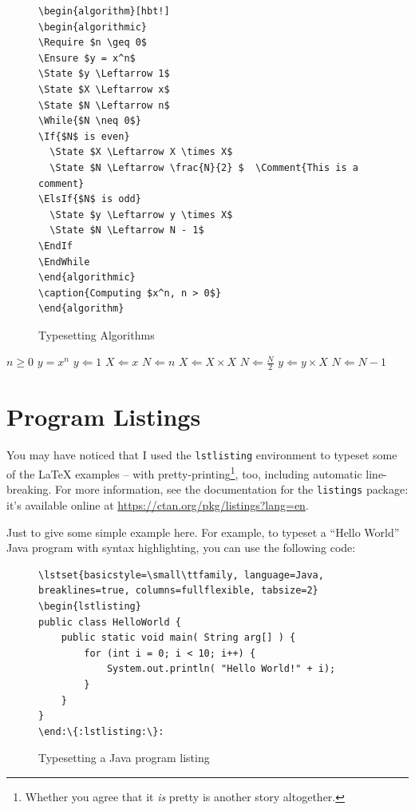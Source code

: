 \begin{figure}[hbt!]
\begin{lstlisting}
\begin{algorithm}[hbt!]
\begin{algorithmic}
\Require $n \geq 0$
\Ensure $y = x^n$
\State $y \Leftarrow 1$
\State $X \Leftarrow x$
\State $N \Leftarrow n$
\While{$N \neq 0$}
\If{$N$ is even}
  \State $X \Leftarrow X \times X$
  \State $N \Leftarrow \frac{N}{2} $  \Comment{This is a comment}
\ElsIf{$N$ is odd}
  \State $y \Leftarrow y \times X$
  \State $N \Leftarrow N - 1$
\EndIf
\EndWhile
\end{algorithmic}
\caption{Computing $x^n, n > 0$}
\end{algorithm}
\end{lstlisting}
\caption{Typesetting Algorithms}\label{fig:lst:algo}
\end{figure}

\begin{algorithm}[hbt!]
\begin{algorithmic}
\Require $n \geq 0$
\Ensure $y = x^n$
\State $y \Leftarrow 1$
\State $X \Leftarrow x$
\State $N \Leftarrow n$
  \State $X \Leftarrow X \times X$
  \State $N \Leftarrow \frac{N}{2} $  
  \State $y \Leftarrow y \times X$
  \State $N \Leftarrow N - 1$
\EndIf
\EndWhile
\end{algorithmic}
\caption{Computing $x^n, n > 0$}
\end{algorithm}

\section{Program Listings}

You may have noticed that I used the \verb|lstlisting| environment to typeset some of the \LaTeX{} examples -- with pretty-printing\footnote{Whether you agree that it \emph{is} pretty is another story altogether.}, too, including automatic line-breaking.  For more information, see the documentation for the \verb|listings| package: it's available online at \url{https://ctan.org/pkg/listings?lang=en}.

Just to give some simple example here.  For example, to typeset a ``Hello World'' Java program with syntax highlighting, you can use the following code:

\begin{figure}[hbt!]
\begin{lstlisting}[escapechar=:,language={}]
\lstset{basicstyle=\small\ttfamily, language=Java, breaklines=true, columns=fullflexible, tabsize=2}
\begin{lstlisting}
public class HelloWorld {
	public static void main( String arg[] ) {
        for (int i = 0; i < 10; i++) {
			System.out.println( "Hello World!" + i);
		}
	}
}
\end:\{:lstlisting:\}:
\end{lstlisting}
\caption{Typesetting a Java program listing}\label{fig:lst:syntax}
\end{figure}

